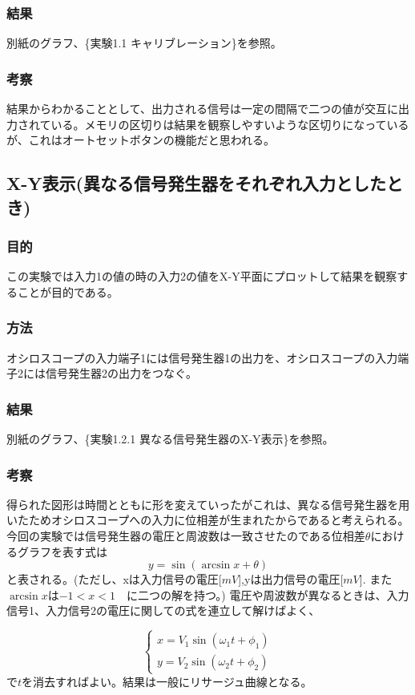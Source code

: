 \documentclass{jsarticle}
\begin{document}
\subsubsection{結果}
別紙のグラフ、\{実験1.1 キャリブレーション\}を参照。
\subsubsection{考察}
結果からわかることとして、出力される信号は一定の間隔で二つの値が交互に出力されている。メモリの区切りは結果を観察しやすいような区切りになっているが、これはオートセットボタンの機能だと思われる。

\subsection{X-Y表示(異なる信号発生器をそれぞれ入力としたとき)}
\subsubsection{目的}
この実験では入力1の値の時の入力2の値をX-Y平面にプロットして結果を観察することが目的である。
\subsubsection{方法}
オシロスコープの入力端子1には信号発生器1の出力を、オシロスコープの入力端子2には信号発生器2の出力をつなぐ。
\subsubsection{結果}
別紙のグラフ、\{実験1.2.1 異なる信号発生器のX-Y表示\}を参照。
\subsubsection{考察}
得られた図形は時間とともに形を変えていったがこれは、異なる信号発生器を用いたためオシロスコープへの入力に位相差が生まれたからであると考えられる。今回の実験では信号発生器の電圧と周波数は一致させたのである位相差$\theta$におけるグラフを表す式は
\begin{equation}
    y = \sin{(\arcsin{x}+\theta)}
\end{equation}
と表される。(ただし、xは入力信号の電圧[$mV$],yは出力信号の電圧[$mV$]. また$\arcsin{x}$は$-1 < x < 1$　に二つの解を持つ。)
電圧や周波数が異なるときは、入力信号1、入力信号2の電圧に関しての式を連立して解けばよく、

\begin{equation}
    \left\{
    \begin{aligned}
        x = V_1\sin{(\omega_1 t + \phi_1)}\\
        y = V_2\sin{(\omega_2 t + \phi_2)}
    \end{aligned}
    \right.
\end{equation}
で$t$を消去すればよい。結果は一般にリサージュ曲線となる。
\end{document}
